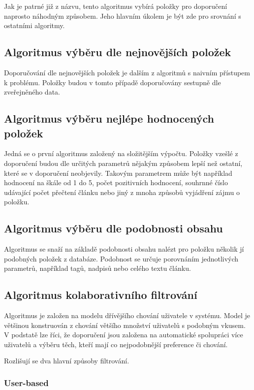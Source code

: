 \documentclass[thesis=M,czech]{FITthesis}[2014/05/07]
\begin{document}
Jak je patrné již z názvu, tento algoritmus vybírá položky pro doporučení naprosto náhodným způsobem. Jeho hlavním úkolem je být zde pro srovnání s ostatními algoritmy. 

\subsection{Algoritmus výběru dle nejnovějších položek}

Doporučování dle nejnovějších položek je dalším z algoritmů s naivním přístupem k problému. Položky budou v tomto případě doporučovány sestupně dle zveřejněného data. 

\subsection{Algoritmus výběru nejlépe hodnocených položek}

Jedná se o první algoritmus založený na složitějším výpočtu. Položky vzešlé z doporučení budou dle určitých parametrů nějakým způsobem lepší než ostatní, které se v doporučení neobjevily. Takovým parametrem může být například hodnocení na škále od 1 do 5, počet pozitivních hodnocení, souhrnné číslo udávající počet přečtení článku nebo jiný z mnoha způsobů vyjádření zájmu o položku. 

\subsection{Algoritmus výběru dle podobnosti obsahu}

Algoritmus se snaží na základě podobnosti obsahu nalézt pro položku několik jí podobných položek z databáze. Podobnost se určuje porovnáním jednotlivých parametrů, například tagů, nadpisů nebo celého textu článku.

\subsection{Algoritmus kolaborativního filtrování}

Algoritmus je založen na modelu dřívějšího chování uživatele v systému. Model je většinou konstruován z chování většího množství uživatelů s podobným vkusem. V podstatě lze říci, že doporučení jsou založena na automatické spolupráci více uživatelů a výběru těch, kteří mají co nejpodobnější preference či chování.

Rozlišují se dva hlavní způsoby filtrování.

\subsubsection{User-based}
\end{document}
